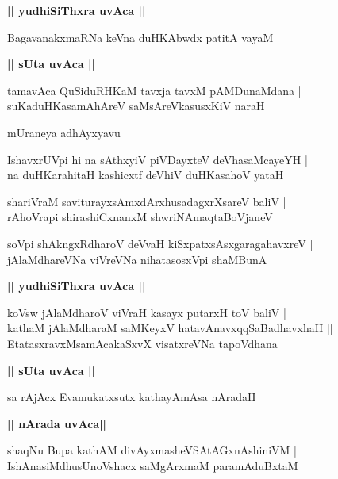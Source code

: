 \documentclass[twoside,12pt,openright]{book}
\newcounter{shloka}[chapter]
\def\uvaca#1{\centerline{{\large\textbf{#1}}}}
\begin{document}
\uvaca{|| yudhiSiThxra uvAca ||}

\begin{shloka}%
BagavanakxmaRNa keVna duHKAbwdx patitA vayaM 
\end{shloka}

\uvaca{|| sUta uvAca ||}

\begin{shloka}%
tamavAca QuSiduRHKaM tavxja tavxM pAMDunaMdana |\\
suKaduHKasamAhAreV saMsAreVkasusxKiV naraH 
\end{shloka}

\begin{center}
mUraneya adhAyxyavu
\end{center}

\begin{shloka}%
IshavxrUVpi hi na sAthxyiV piVDayxteV deVhasaMcayeYH |\\
na duHKarahitaH kashicxtf deVhiV duHKasahoV yataH 
\end{shloka}

\begin{shloka}%
shariVraM saviturayxsAmxdArxhusadagxrXsareV baliV |\\
rAhoVrapi shirashiCxnanxM shwriNAmaqtaBoVjaneV
\end{shloka}

\begin{shloka}%
soVpi shAkngxRdharoV deVvaH kiSxpatxsAsxgaragahavxreV |\\
jAlaMdhareVNa viVreVNa nihatasosxVpi shaMBunA 
\end{shloka}

\uvaca{|| yudhiSiThxra uvAca ||}

\begin{shloka}%
koVsw jAlaMdharoV viVraH kasayx putarxH toV baliV |\\
kathaM jAlaMdharaM saMKeyxV hatavAnavxqqSaBadhavxhaH ||\\
EtatasxravxMsamAcakaSxvX visatxreVNa tapoVdhana
\end{shloka}

\uvaca{|| sUta uvAca ||}

\begin{shloka}%
sa rAjAcx Evamukatxsutx kathayAmAsa nAradaH 
\end{shloka}

\uvaca{|| nArada uvAca||}

\begin{shloka}%
shaqNu Bupa kathAM divAyxmasheVSAtAGxnAshiniVM |\\
IshAnasiMdhusUnoVshacx saMgArxmaM paramAduBxtaM 
\end{shloka}
\end{document}
